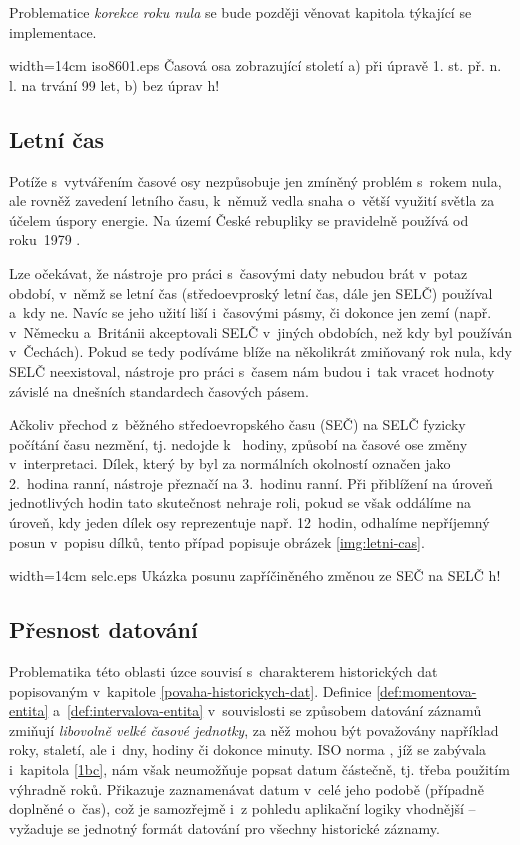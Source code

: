 			Problematice \emph{korekce roku nula} se bude později věnovat kapitola týkající se implementace.
			
			  {width=14cm}
			  {iso8601.eps}
			  {Časová osa zobrazující století a) při úpravě 1. st. př. n. l. na trvání 99 let, b) bez úprav}
			  {h!}
			  
		\subsection{Letní čas}
			\label{selc}
			Potíže s~vytvářením časové osy nezpůsobuje jen zmíněný problém s~rokem nula, ale rovněž zavedení letního času, k~němuž vedla snaha o~větší využití světla za účelem úspory energie. Na území České rebupliky se pravidelně používá od roku~1979 \cite{poupa-2008}.
			
			Lze očekávat, že nástroje pro práci s~časovými daty nebudou brát v~potaz období, v~němž se letní čas (středoevproský letní čas, dále jen SELČ) používal a~kdy ne. Navíc se jeho užití liší i~časovými pásmy, či dokonce jen zemí (např. v~Německu a~Británii akceptovali SELČ v~jiných obdobích, než kdy byl používán v~Čechách). Pokud se tedy podíváme blíže na několikrát zmiňovaný rok nula, kdy SELČ neexistoval, nástroje pro práci s~časem nám budou i~tak vracet hodnoty závislé na dnešních standardech časových pásem. 
			
			Ačkoliv přechod z~běžného středoevropského času (SEČ) na SELČ fyzicky počítání času nezmění, tj. nedojde k~ hodiny, způsobí na časové ose změny v~interpretaci. Dílek, který by byl za normálních okolností označen jako 2.~hodina ranní, nástroje přeznačí na 3.~hodinu ranní. Při přiblížení na úroveň jednotlivých hodin tato skutečnost nehraje roli, pokud se však oddálíme na úroveň, kdy jeden dílek osy reprezentuje např. 12~hodin, odhalíme nepříjemný posun v~popisu dílků, tento případ popisuje obrázek \ref{img:letni-cas}. 
						
			  {width=14cm}
			  {selc.eps}
			  {Ukázka posunu zapříčiněného změnou ze SEČ na SELČ}
			  {h!}
			  
		\subsection{Přesnost datování}
			\label{presnost-datovani}
			Problematika této oblasti úzce souvisí s~charakterem historických dat popisovaným v~kapitole \ref{povaha-historickych-dat}. Definice \ref{def:momentova-entita} a~\ref{def:intervalova-entita} v~souvislosti se způsobem datování záznamů zmiňují \emph{libovolně velké časové jednotky}, za něž mohou být považovány například roky, staletí,  ale i~dny, hodiny či dokonce minuty. ISO norma \cite{iso-8601}, jíž se zabývala i~kapitola \ref{1bc}, nám však neumožňuje popsat datum částečně, tj. třeba použitím výhradně roků. Přikazuje zaznamenávat datum v~celé jeho podobě (případně doplněné o~čas), což je samozřejmě i~z pohledu aplikační logiky vhodnější -- vyžaduje se jednotný formát datování pro všechny historické záznamy.
			
